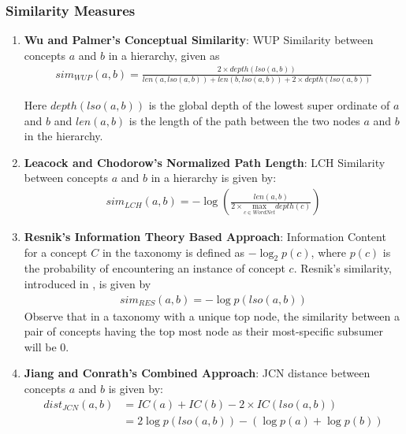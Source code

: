 \subsubsection{Similarity Measures} 
\label{section:similarityMeasures}
\begin{enumerate}
\item \textbf{Wu and Palmer's Conceptual Similarity}: WUP Similarity \citep{WuPalmer:1994} between concepts $a$ and $b$ in a hierarchy, given as
\begin{align}
sim_{WUP}(a,b) = \frac{2 \times depth(lso(a,b))}{len(a,lso(a,b)) + len(b,lso(a,b)) + 2 \times depth(lso(a,b))} \label{eq:WUP}
\end{align}

Here $depth(lso(a,b))$ is the global depth of the lowest super ordinate of $a$ and $b$ and $len(a,b)$ is the length of the path between the two nodes $a$ and $b$ in the hierarchy.

\item \textbf{Leacock and Chodorow's Normalized Path Length}: LCH Similarity \citep{LCH:1998} between concepts $a$ and $b$ in a hierarchy is given by:
\begin{align}
 sim_{LCH}(a,b) = -\log\left(\frac{len(a,b)}{2 \times \underset{c \in WordNet}{\mbox{max}} depth(c)}\right) \label{eq:LCH}
\end{align}

\item \textbf{Resnik's Information Theory Based Approach}: Information Content for a concept $C$ in the taxonomy is defined as $-\log_2p(c)$, where $p(c)$ is the probability of encountering an instance of concept $c$. Resnik's similarity, introduced in \citep{Resnik:1995}, is given by
\begin{align}
sim_{RES}(a,b) = - \log p (lso(a,b)) \label{eq:Resnik}
\end{align}
Observe that in a taxonomy with a unique top node, the similarity between a pair of concepts having the top most node as their most-specific subsumer will be 0.

\item \textbf{Jiang and Conrath's Combined Approach}: JCN distance \citep{JCN:1997} between concepts $a$ and $b$ is given by:
\begin{align}
dist_{JCN}(a,b) &= IC(a) + IC(b) - 2 \times  IC(lso(a,b)) \label{eq:JC1}\\
&= 2 \log p(lso(a,b)) - (\log p(a) + \log p(b)) \label{eq:JC2}
\end{align}


\end{enumerate}
